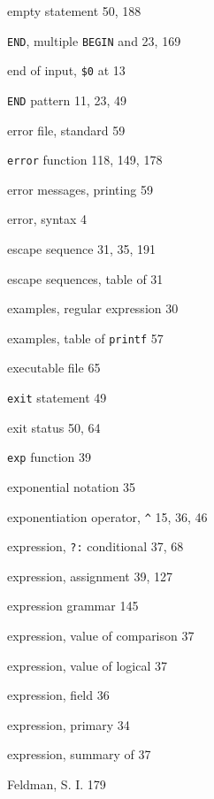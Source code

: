 \begin{multicols}{3}
\hangindent=4pc  empty statement 50, 188

\hangindent=4pc  \verb'END', multiple \verb'BEGIN' and 23, 169

\hangindent=4pc  end of input, \verb'$0' at 13

\hangindent=4pc  \verb'END' pattern 11, 23, 49

\hangindent=4pc  error file, standard 59

\hangindent=4pc  \verb'error' function 118, 149, 178

\hangindent=4pc  error messages, printing 59

\hangindent=4pc  error, syntax 4

\hangindent=4pc  escape sequence 31, 35, 191

\hangindent=4pc  escape sequences, table of 31

\hangindent=4pc  examples, regular expression 30

\hangindent=4pc  examples, table of \verb'printf' 57

\hangindent=4pc  executable file 65

\hangindent=4pc  \verb'exit' statement 49

\hangindent=4pc  exit status 50, 64

\hangindent=4pc  \verb'exp' function 39

\hangindent=4pc  exponential notation 35

\hangindent=4pc  exponentiation operator, \verb'^' 15, 36, 46

\hangindent=4pc  expression, \verb'?:' conditional 37, 68

\hangindent=4pc  expression, assignment 39, 127

\hangindent=4pc  expression grammar 145

\hangindent=4pc  expression, value of comparison 37

\hangindent=4pc  expression, value of logical 37

\hangindent=4pc  expression, field 36

\hangindent=4pc  expression, primary 34

\hangindent=4pc  expression, summary of 37

\hangindent=4pc  Feldman, S. I. 179


\end{multicols}
